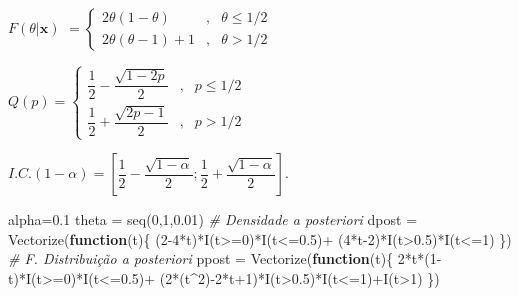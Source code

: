 \documentclass[
]{book}
\newenvironment{Shaded}{\begin{snugshade}}{\end{snugshade}}
\newcommand{\CommentTok}[1]{\textcolor[rgb]{0.56,0.35,0.01}{\textit{#1}}}
\newcommand{\ControlFlowTok}[1]{\textcolor[rgb]{0.13,0.29,0.53}{\textbf{#1}}}
\newcommand{\DecValTok}[1]{\textcolor[rgb]{0.00,0.00,0.81}{#1}}
\newcommand{\FloatTok}[1]{\textcolor[rgb]{0.00,0.00,0.81}{#1}}
\newcommand{\FunctionTok}[1]{\textcolor[rgb]{0.00,0.00,0.00}{#1}}
\newcommand{\NormalTok}[1]{#1}
\newcommand{\OtherTok}[1]{\textcolor[rgb]{0.56,0.35,0.01}{#1}}
\newcommand{\SpecialCharTok}[1]{\textcolor[rgb]{0.00,0.00,0.00}{#1}}
\begin{document}
\(F(\theta|\boldsymbol x)\) \(=\left\{\begin{array}{lcc} 2\theta(1-\theta) &,& \theta\leq 1/2\\ 2\theta(\theta-1)+1 &,& \theta>1/2\end{array}\right.\)

\(Q(p)=\left\{\begin{array}{lcc} \dfrac{1}{2}-\dfrac{\sqrt{1-2p}}{2} &,& p\leq 1/2\\ \dfrac{1}{2}+\dfrac{\sqrt{2p-1}}{2} &,& p>1/2\end{array}\right.\)

\(I.C.(1-\alpha)=\left[\dfrac{1}{2}-\dfrac{\sqrt{1-\alpha}}{2};\dfrac{1}{2}+\dfrac{\sqrt{1-\alpha}}{2}\right]\).

\begin{Shaded}
\begin{Highlighting}[]
\NormalTok{alpha}\OtherTok{=}\FloatTok{0.1}
\NormalTok{theta }\OtherTok{=} \FunctionTok{seq}\NormalTok{(}\DecValTok{0}\NormalTok{,}\DecValTok{1}\NormalTok{,}\FloatTok{0.01}\NormalTok{)}
\CommentTok{\# Densidade a posteriori}
\NormalTok{dpost }\OtherTok{=} \FunctionTok{Vectorize}\NormalTok{(}\ControlFlowTok{function}\NormalTok{(t)\{ (}\DecValTok{2{-}4}\SpecialCharTok{*}\NormalTok{t)}\SpecialCharTok{*}\FunctionTok{I}\NormalTok{(t}\SpecialCharTok{\textgreater{}=}\DecValTok{0}\NormalTok{)}\SpecialCharTok{*}\FunctionTok{I}\NormalTok{(t}\SpecialCharTok{\textless{}=}\FloatTok{0.5}\NormalTok{)}\SpecialCharTok{+}
\NormalTok{    (}\DecValTok{4}\SpecialCharTok{*}\NormalTok{t}\DecValTok{{-}2}\NormalTok{)}\SpecialCharTok{*}\FunctionTok{I}\NormalTok{(t}\SpecialCharTok{\textgreater{}}\FloatTok{0.5}\NormalTok{)}\SpecialCharTok{*}\FunctionTok{I}\NormalTok{(t}\SpecialCharTok{\textless{}=}\DecValTok{1}\NormalTok{) \})}
\CommentTok{\# F. Distribuição a posteriori}
\NormalTok{ppost }\OtherTok{=} \FunctionTok{Vectorize}\NormalTok{(}\ControlFlowTok{function}\NormalTok{(t)\{ }\DecValTok{2}\SpecialCharTok{*}\NormalTok{t}\SpecialCharTok{*}\NormalTok{(}\DecValTok{1}\SpecialCharTok{{-}}\NormalTok{t)}\SpecialCharTok{*}\FunctionTok{I}\NormalTok{(t}\SpecialCharTok{\textgreater{}=}\DecValTok{0}\NormalTok{)}\SpecialCharTok{*}\FunctionTok{I}\NormalTok{(t}\SpecialCharTok{\textless{}=}\FloatTok{0.5}\NormalTok{)}\SpecialCharTok{+}
\NormalTok{    (}\DecValTok{2}\SpecialCharTok{*}\NormalTok{(t}\SpecialCharTok{\^{}}\DecValTok{2}\NormalTok{)}\SpecialCharTok{{-}}\DecValTok{2}\SpecialCharTok{*}\NormalTok{t}\SpecialCharTok{+}\DecValTok{1}\NormalTok{)}\SpecialCharTok{*}\FunctionTok{I}\NormalTok{(t}\SpecialCharTok{\textgreater{}}\FloatTok{0.5}\NormalTok{)}\SpecialCharTok{*}\FunctionTok{I}\NormalTok{(t}\SpecialCharTok{\textless{}=}\DecValTok{1}\NormalTok{)}\SpecialCharTok{+}\FunctionTok{I}\NormalTok{(t}\SpecialCharTok{\textgreater{}}\DecValTok{1}\NormalTok{) \})}

\end{Highlighting}
\end{Shaded}
\end{document}
